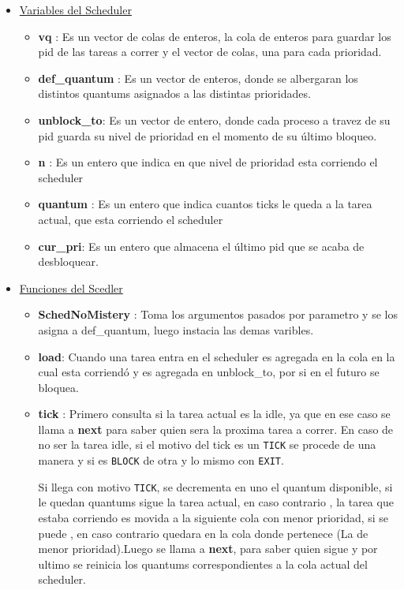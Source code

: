 	\begin{itemize}
		\item \underline{Variables del Scheduler}
			\begin{itemize}
				\item \textbf{vq} : Es un vector de colas de enteros, la cola de enteros para guardar los pid de las tareas a correr y el vector de colas, una para cada prioridad.
				\item \textbf{def\_quantum} : Es un vector de enteros, donde se albergaran los distintos quantums asignados a las distintas prioridades.
				\item \textbf{unblock\_to}: Es un vector de entero, donde cada proceso a travez de su pid guarda su nivel de prioridad en el momento de su último bloqueo.
				\item \textbf{n} : Es un entero que indica en que nivel de prioridad esta corriendo el scheduler
				\item \textbf{quantum} : Es un entero que indica cuantos ticks le queda a la tarea actual, que 	esta corriendo el scheduler
				\item \textbf{cur\_pri}: Es un entero que almacena el último pid que se acaba de desbloquear.
			\end{itemize}
		\item \underline{Funciones del Scedler}
			\begin{itemize}
				\item \textbf{SchedNoMistery} : Toma los argumentos pasados por parametro y se los asigna a def\_quantum, luego instacia las demas varibles.
				\item \textbf{load}: Cuando una tarea entra en el scheduler es agregada en la cola en la cual esta corriendó y es agregada en unblock\_to, por si en el futuro se bloquea.
				\item \textbf{tick} : Primero consulta si la tarea actual es la idle, ya que en ese caso se llama a \textbf{next} para saber quien sera la proxima tarea a correr. En caso de no ser la tarea idle, si el motivo del tick es un \texttt{TICK} se procede de una
				manera y si es \texttt{BLOCK} de otra y lo mismo con \texttt{EXIT}. 
				
				Si llega con motivo \texttt{TICK}, se decrementa en uno el quantum disponible, si le quedan quantums sigue la tarea actual, en caso contrario , la tarea que estaba corriendo es movida a la siguiente cola con menor prioridad, si se puede , en caso contrario quedara en la cola donde pertenece (La de menor prioridad).Luego se llama a \textbf{next}, para saber quien sigue y por ultimo se reinicia los quantums correspondientes a la cola actual del scheduler.
				

\end{itemize}
\end{itemize}
